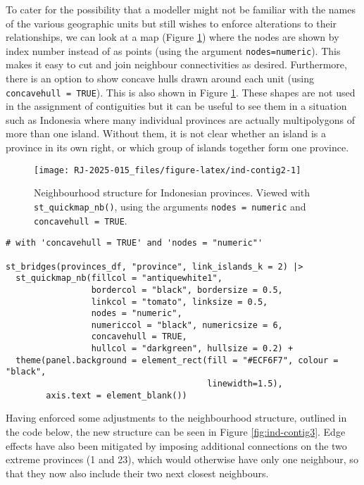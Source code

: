 To cater for the possibility that a modeller might not be familiar with the names of the various geographic units but still wishes to enforce alterations to their relationships, we can look at a map (Figure \ref{fig:ind-contig2}) where the nodes are shown by
index number instead of as points (using the argument \texttt{nodes=\textquotesingle{}numeric\textquotesingle{}}). This makes it easy to cut and join neighbour connectivities as desired. Furthermore, there is an option to
show concave hulls drawn around each unit (using \texttt{concavehull\ =\ TRUE}). This is also shown in Figure \ref{fig:ind-contig2}. These shapes are not used in the assignment of contiguities but it can be useful to see them in a situation such as Indonesia where many individual provinces are actually multipolygons of more than one island. Without them, it is not clear whether an island is a province in its own right, or which group of islands together form one province.



\begin{figure}

{\centering \texttt{[image: RJ-2025-015\_files/figure-latex/ind-contig2-1]} 

}

\caption{Neighbourhood structure for Indonesian provinces. Viewed with \texttt{st\_quickmap\_nb()}, using the arguments \texttt{nodes\ =\ \textquotesingle{}numeric\textquotesingle{}} and \texttt{concavehull\ =\ TRUE}.}\label{fig:ind-contig2}
\end{figure}

\begin{verbatim}
# with 'concavehull = TRUE' and 'nodes = "numeric"'

st_bridges(provinces_df, "province", link_islands_k = 2) |>
  st_quickmap_nb(fillcol = "antiquewhite1",
                 bordercol = "black", bordersize = 0.5,
                 linkcol = "tomato", linksize = 0.5,
                 nodes = "numeric",
                 numericcol = "black", numericsize = 6,
                 concavehull = TRUE,
                 hullcol = "darkgreen", hullsize = 0.2) +
  theme(panel.background = element_rect(fill = "#ECF6F7", colour = "black",
                                        linewidth=1.5),
        axis.text = element_blank())
\end{verbatim}

Having enforced some adjustments to the neighbourhood structure, outlined in the code below, the
new structure can be seen in Figure \ref{fig:ind-contig3}. Edge effects
have also been mitigated by imposing additional connections on the two extreme
provinces (1 and 23), which would otherwise have only one neighbour, so that they now also include
their two next closest neighbours.



